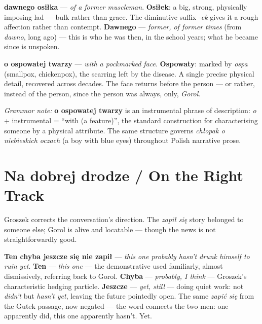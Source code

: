 \textbf{dawnego osiłka} --- \textit{of a former muscleman}.
\textbf{Osiłek}: a big, strong, physically imposing lad ---
bulk rather than grace. The diminutive suffix \textit{-ek} gives
it a rough affection rather than contempt. \textbf{Dawnego}
--- \textit{former, of former times} (from \textit{dawno},
long ago) --- this is who he was then, in the school
years; what he became since is unspoken.

\textbf{o ospowatej twarzy} --- \textit{with a pockmarked face}.
\textbf{Ospowaty}: marked by \textit{ospa} (smallpox,
chickenpox), the scarring left by the disease. A single precise
physical detail, recovered across decades. The face returns
before the person --- or rather, instead of the person, since
the person was always, only, \textit{Gorol}.

\medskip
\noindent\textit{Grammar note:} \textbf{o ospowatej twarzy} is
an instrumental phrase of description: \textit{o} + instrumental
= ``with (a feature)'', the standard construction for
characterising someone by a physical attribute. The same
structure governs \textit{chłopak o niebieskich oczach} (a boy
with blue eyes) throughout Polish narrative prose.

\section{Na dobrej drodze / On the Right Track}



Groszek corrects the conversation's direction. The \textit{zapił
się} story belonged to someone else; Gorol is alive and
locatable --- though the news is not straightforwardly good.

\textbf{Ten chyba jeszcze się nie zapił} --- \textit{this one
probably hasn't drunk himself to ruin yet}. \textbf{Ten} ---
\textit{this one} --- the demonstrative used familiarly, almost
dismissively, referring back to Gorol. \textbf{Chyba} ---
\textit{probably, I think} --- Groszek's characteristic hedging
particle. \textbf{Jeszcze} --- \textit{yet, still} --- doing
quiet work: not \textit{didn't} but \textit{hasn't yet}, leaving
the future pointedly open. The same \textit{zapić się} from the
Gutek passage, now negated --- the word connects the two men:
one apparently did, this one apparently hasn't. Yet.

